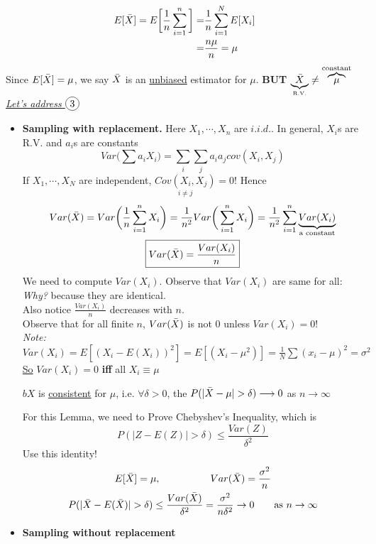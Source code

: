 \begin{align*}
	E[\bar{X}] = E\bigg[\frac{1}{n} \sum\limits_{i=1}^n \bigg] = & \frac{1}{n} \sum\limits_{i=1}^N E[X_i]\\
	= & \frac{n\mu}{n} = \mu 
\end{align*}
Since $E[\bar{X}] = \mu$, we say $\bar{X}$ is an \underline{unbiased} estimator for $\mu$. \qquad \textbf{BUT} $\underbrace{\bar{X}}_{\text{\tiny R.V.}} \neq \overbrace{\mu}^{\text{constant}}$\\
\underline{\textit{Let's address $\circled{3}$}}
\begin{itemize}[label={--}]
	\item \textbf{Sampling with replacement.}
	Here $X_1, \cdots, X_n$ are $i.i.d.$. In general, $X_i$s are R.V. and $a_i$s are constants
	\begin{equation*}
		Var\big(\sum a_i X_i\big) = \sum\limits_i \sum\limits_j a_i a_j cov(X_i, X_j) 
	\end{equation*}
	If $X_1, \cdots, X_N$ are independent, $\underset{i \neq j}{Cov(X_i, X_j)} = 0$! Hence
	\begin{gather*}
		Var(\bar{X}) = Var\bigg(\frac{1}{n} \sum\limits_{i=1}^n X_i \bigg) = \frac{1}{n^2} Var\bigg( \sum\limits_{i=1}^n X_i \bigg) = \frac{1}{n^2}  \sum\limits_{i=1}^n \underbrace{Var(X_i)}_{\text{a constant}}\\
		\boxed{Var(\bar{X}) = \frac{Var(X_i)}{n}}
	\end{gather*}
	We need to compute $Var(X_i)$. Observe that $Var(X_i)$ are same for all: \textit{Why?} because they are identical.\\
	Also notice $\frac{Var(X_i)}{n}$ decreases with $n$.\\
	Observe that for all finite $n$, $Var(\bar{X})$ is not 0 unless $Var(X_i) = 0$!\\
	\emph{Note:} $Var(X_i) = E[(X_i - E(X_i))^2] = E[(X_i - \mu^2)] = \frac{1}{N} \sum (x_i - \mu)^2 = \sigma^2$\\
	\underline{So} $Var(X_i) = 0$ \textbf{iff} all $X_i \equiv \mu$
	\begin{lemma}
		$bX$ is \underline{consistent} for $\mu$, i.e. $\forall \delta > 0$, the $P(|\bar{X} - \mu| > \delta) \longrightarrow 0$ as $n\rightarrow \infty$
	\end{lemma}
	For this Lemma, we need to Prove Chebyshev's Inequality, which is
	\begin{equation*}
		P(|Z - E(Z)| > \delta) \leq \frac{Var(Z)}{\delta^2}
	\end{equation*}
	Use this identity!
	\begin{gather*}
		E[\bar{X}] = \mu, \hspace{5em} Var(\bar{X}) = \frac{\sigma^2}{n}\\
		P(|\bar{X} - E(\bar{X})| > \delta) \leq \frac{Var(\bar{X})}{\delta^2} = \frac{\sigma^2}{n\delta^2} \rightarrow 0 \qquad \text{as } n \rightarrow \infty
	\end{gather*}
	\item \textbf{Sampling without replacement}

\end{itemize}